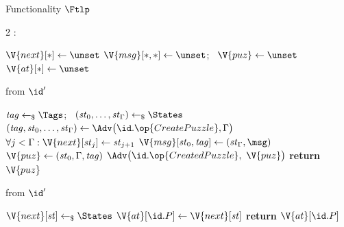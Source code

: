 \begin{interface}[nofloat]{Functionality $\Ftlp$ \\
}

{\scriptsize
\setlength{\columnsep}{1.4em}
\begin{multicols}{2}
:
\begin{algorithmic}[1]
\setcounter{contline}{0}\algcont
\State $\V{next}[*] \gets \unset$
\State $\V{msg}[*,*] \gets \unset$; \ $\V{puz} \gets \unset$
\State $\V{at}[*] \gets \unset$
\algsave
\end{algorithmic}
\vspace{1.4ex}

 \quad from $\id'$
\begin{algorithmic}[1]
\algcont
{} \label{ln:tlponce}
  \State $\mathit{tag} \gets_{\$} \Tags$; \ $(\mathit{st}_{0}, \ldots, \mathit{st}_{\Gamma}) \gets_{\$} \States$ \label{ln:tlphonest}
\EndIf
{}
  \State $(\mathit{tag}, \mathit{st}_{0}, \ldots, \mathit{st}_{\Gamma}) \gets \Adv\bigl(\id.\op{CreatePuzzle}, \Gamma\bigr)$ \label{ln:tlpcorrupt}
\EndIf
\State $\forall j < \Gamma : \V{next}[\mathit{st}_{j}] \gets \mathit{st}_{j+1}$ \label{ln:tlpchain}
\State $\V{msg}[\mathit{st}_{0}, \mathit{tag}] \gets (\mathit{st}_{\Gamma}, \msg)$
\State $\V{puz} \gets (\mathit{st}_{0}, \Gamma, \mathit{tag})$
\State $\Adv\bigl(\id.\op{CreatedPuzzle},\ \V{puz}\bigr)$ \label{ln:tlpleakpuz}
\State \textbf{return} $\V{puz}$
\algsave
\end{algorithmic}
\vspace{1.4ex}

 \quad from $\id'$
\begin{algorithmic}[1]
\algcont
{}
 \label{ln:tlpoffchain}
  \State $\V{next}[\mathit{st}] \gets_{\$} \States$ \label{ln:tlpstray}
\EndIf
\State $\V{at}[\id.P] \gets \V{next}[\mathit{st}]$ \label{ln:tlpstep}
\State \textbf{return} $\V{at}[\id.P]$
\algsave
\end{algorithmic}
\vspace{1.4ex}


\end{multicols}}
\end{interface}
